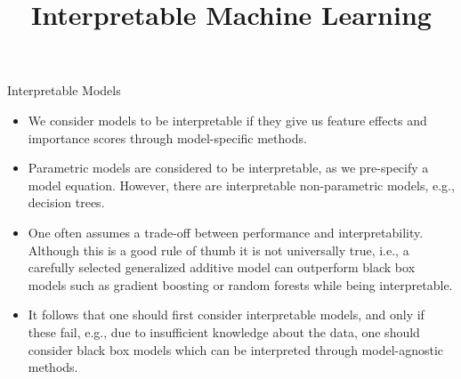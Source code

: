 \documentclass[11pt,compress,t,notes=noshow, xcolor=table]{beamer}
\title{Interpretable Machine Learning}
\institute{\href{https://compstat-lmu.github.io/lecture_iml/}{compstat-lmu.github.io/lecture\_iml}}
\date{}
\begin{document}


\newcommand{\titlefigure}{figure/whitebox}
\newcommand{\learninggoals}{
\item What characteristics does an interpretable model have
\item Why we should use interpretable models
\item Examples for interpretable models: linear and polynomial regression models, generalized linear models, generalized additive models, model-based boosting, rule-based learning}


\begin{vbframe}{Interpretable Models}
\begin{itemize}
\item We consider models to be interpretable if they give us feature effects and importance scores through model-specific methods.
\item Parametric models are considered to be interpretable, as we pre-specify a model equation. However, there are interpretable non-parametric models, e.g., decision trees.
\item One often assumes a trade-off between performance and interpretability. Although this is a good rule of thumb it is not universally true, i.e., a carefully selected generalized additive model can outperform black box models such as gradient boosting or random forests while being interpretable.
\item It follows that one should first consider interpretable models, and only if these fail, e.g., due to insufficient knowledge about the data, one should consider black box models which can be interpreted through model-agnostic methods.
\end{itemize}
\end{vbframe}
\end{document}
